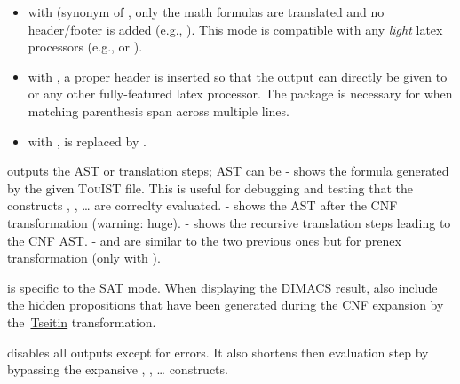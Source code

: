 \begin{itemize}[noitemsep,topsep=\mdcompacttopsep]%

\item with  (synonym of , only the math formulas
are translated and no header/footer is added (e.g.,
). This mode is compatible with any
\emph{light} latex processors (e.g.,  or ).%

\item with , a proper header is inserted so that the output can
directly be given to  or any other fully-featured latex
processor. The  package is necessary for
 when matching parenthesis span
across multiple lines.%

\item with ,  is replaced by
.%
\end{itemize}%

\noindent\textbf{} outputs the AST or translation steps; AST can be
-  shows the formula generated by the given {\scshape TouIST} file. This
   is useful for debugging and testing that the constructs ,
   , \dots{} are correclty evaluated.
-  shows the AST after the CNF transformation (warning: huge).
-  shows the recursive translation steps leading to the
   CNF AST.
-  and  are similar to the two previous ones
   but for prenex transformation (only with ).%

\textbf{} is specific to the SAT mode. When displaying the
DIMACS result, also include the hidden propositions that have been
generated during the CNF expansion by the~\href{https://en.wikipedia.org/wiki/Conjunctive_normal_form}{Tseitin} transformation.%

\noindent\textbf{} disables all outputs except for errors. It also shortens
then evaluation step by bypassing the expansive , ,
\dots{} constructs.%

